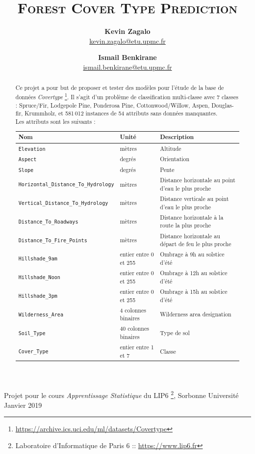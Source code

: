 \documentclass[12pt,a4paper]{article}
\title{\scshape \huge Forest Cover Type Prediction}
\author{\textbf{Kevin Zagalo} \\  \url{kevin.zagalo@etu.upmc.fr}  \and \textbf{Ismail Benkirane} \\ \url{ismail.benkirane@etu.upmc.fr}}
\date{}
\numberwithin{equation}{section}
\newcommand{\elevation}{\texttt{Elevation}}
\newcommand{\aspect}{\texttt{Aspect}}
\newcommand{\slope}{\texttt{Slope}}
\newcommand{\hhydro}{\texttt{Horizontal\_Distance\_To\_Hydrology}}
\newcommand{\vhydro}{\texttt{Vertical\_Distance\_To\_Hydrology}}
\newcommand{\roadways}{\texttt{Distance\_To\_Roadways}}
\newcommand{\hilshadeM}{\texttt{Hillshade\_9am}}
\newcommand{\hilshadeN}{\texttt{Hillshade\_Noon}}
\newcommand{\hilshadeA}{\texttt{Hillshade\_3pm}}
\newcommand{\fire}{\texttt{Distance\_To\_Fire\_Points}}
\newcommand{\wilderness}{\texttt{Wilderness\_Area}}
\newcommand{\soil}{\texttt{Soil\_Type}}
\newcommand{\cover}{\texttt{Cover\_Type}}
\begin{document}
	\maketitle
	
{\small Projet pour le cours \textit{Apprentissage Statistique} du LIP6 \footnote[0]{Laboratoire d'Informatique de Paris 6 :: \url{https://www.lip6.fr}}, Sorbonne Université} \hfill Janvier 2019
	
	\hrulefill

	\begin{abstract}
		  Ce projet a pour but de proposer et tester des modèles pour l'étude de la base de données  \textit{Covertype} \footnote{\url{https://archive.ics.uci.edu/ml/datasets/Covertype}}. Il s'agit d'un problème de classification multi-classe avec 7 classes  : Spruce/Fir, Lodgepole Pine, Ponderosa Pine, Cottonwood/Willow, Aspen, Douglas-fir, Krummholz, et 581\,012 instances de 54 attributs sans données manquantes.\\
		  
		  Les attributs sont les suivants : 
		  
		  \begin{flushleft}
		  	\begin{tabular}{l l p{5.2cm}}
		  		Nom & Unité & Description \\
		  		\hline
		  		\elevation & mètres & Altitude \\ 
		  		\aspect & degrés & Orientation \\ 
		  		\slope & degrés & Pente \\
		  		\hhydro & mètres & Distance horizontale au point d’eau le plus proche\\
		  		\vhydro & mètres & Distance verticale au point d’eau le plus proche \\
		  		\roadways & mètres & Distance horizontale à la route la plus proche \\
		  		\fire & mètres & Distance horizontale au départ de feu le plus proche\\
		  		\hilshadeM & entier entre 0 et 255 & Ombrage à 9h au solstice d’été \\
		  		\hilshadeN & entier entre 0 et 255 & Ombrage à 12h au solstice d'été\\
		  		\hilshadeA & entier entre 0 et 255 &  Ombrage à 15h au solstice d'été \\
		  		\wilderness & 4 colonnes binaires & Wilderness area designation \\
		  		\soil & 40 colonnes binaires & Type de sol\\
		  		\cover & entier entre 1 et 7 & Classe\\
		  	\end{tabular}
		  \end{flushleft}
	\end{abstract}
\end{document}
